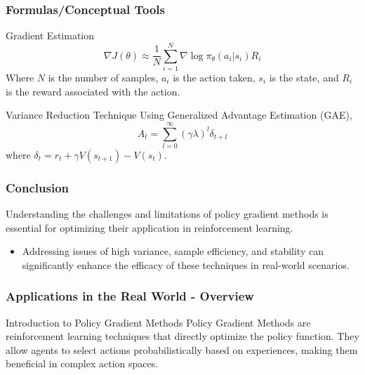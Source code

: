 \documentclass[aspectratio=169]{beamer}
\begin{document}
\begin{frame}[fragile]
    \frametitle{Formulas/Conceptual Tools}
    \begin{block}{Gradient Estimation}
        \begin{equation}
            \nabla J(\theta) \approx \frac{1}{N} \sum_{i=1}^{N} \nabla \log \pi_\theta(a_i | s_i) R_i
        \end{equation}
        Where \( N \) is the number of samples, \( a_i \) is the action taken, \( s_i \) is the state, and \( R_i \) is the reward associated with the action.
    \end{block}

    \begin{block}{Variance Reduction Technique}
        Using Generalized Advantage Estimation (GAE),
        \begin{equation}
            A_t = \sum_{l=0}^{\infty} (\gamma \lambda)^l \delta_{t+l}
        \end{equation}
        where \( \delta_t = r_t + \gamma V(s_{t+1}) - V(s_t) \).
    \end{block}
\end{frame}

\begin{frame}[fragile]
    \frametitle{Conclusion}
    Understanding the challenges and limitations of policy gradient methods is essential for optimizing their application in reinforcement learning. 
    \begin{itemize}
        \item Addressing issues of high variance, sample efficiency, and stability can significantly enhance the efficacy of these techniques in real-world scenarios.
    \end{itemize}
\end{frame}

\begin{frame}[fragile]
    \frametitle{Applications in the Real World - Overview}
    \begin{block}{Introduction to Policy Gradient Methods}
        Policy Gradient Methods are reinforcement learning techniques that directly optimize the policy function. They allow agents to select actions probabilistically based on experiences, making them beneficial in complex action spaces.
    \end{block}
\end{frame}
\end{document}
